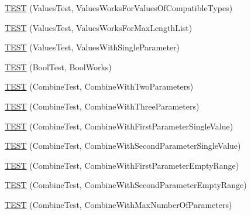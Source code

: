 \begin{DoxyCompactItemize}
\item 
\mbox{\hyperlink{_obj__test_2lib_2googletest-master_2googletest_2test_2googletest-param-test-test_8cc_a079a199d832d0c61689193e9c9a4fd1a}{T\+E\+ST}} (Values\+Test, Values\+Works\+For\+Values\+Of\+Compatible\+Types)
\item 
\mbox{\hyperlink{_obj__test_2lib_2googletest-master_2googletest_2test_2googletest-param-test-test_8cc_a5d96d28bb6fd22c56222a4b358a8c65e}{T\+E\+ST}} (Values\+Test, Values\+Works\+For\+Max\+Length\+List)
\item 
\mbox{\hyperlink{_obj__test_2lib_2googletest-master_2googletest_2test_2googletest-param-test-test_8cc_af5c833610dcfcdfed7bcaa5f2e7dcf16}{T\+E\+ST}} (Values\+Test, Values\+With\+Single\+Parameter)
\item 
\mbox{\hyperlink{_obj__test_2lib_2googletest-master_2googletest_2test_2googletest-param-test-test_8cc_a3f3ae54fc86fcf5881329fb7e8e4b8ee}{T\+E\+ST}} (Bool\+Test, Bool\+Works)
\item 
\mbox{\hyperlink{_obj__test_2lib_2googletest-master_2googletest_2test_2googletest-param-test-test_8cc_a44831b3cbd99dd9df97741b57ce5f54c}{T\+E\+ST}} (Combine\+Test, Combine\+With\+Two\+Parameters)
\item 
\mbox{\hyperlink{_obj__test_2lib_2googletest-master_2googletest_2test_2googletest-param-test-test_8cc_abb0566c1dd1e93b040122f62019342b7}{T\+E\+ST}} (Combine\+Test, Combine\+With\+Three\+Parameters)
\item 
\mbox{\hyperlink{_obj__test_2lib_2googletest-master_2googletest_2test_2googletest-param-test-test_8cc_a93f6f860828c8e67a9bf8b8e254d8bde}{T\+E\+ST}} (Combine\+Test, Combine\+With\+First\+Parameter\+Single\+Value)
\item 
\mbox{\hyperlink{_obj__test_2lib_2googletest-master_2googletest_2test_2googletest-param-test-test_8cc_aa3972149c4cee8b2e4aa42890cf6faca}{T\+E\+ST}} (Combine\+Test, Combine\+With\+Second\+Parameter\+Single\+Value)
\item 
\mbox{\hyperlink{_obj__test_2lib_2googletest-master_2googletest_2test_2googletest-param-test-test_8cc_a05e6de39d2004ec6509fd02c41b1f941}{T\+E\+ST}} (Combine\+Test, Combine\+With\+First\+Parameter\+Empty\+Range)
\item 
\mbox{\hyperlink{_obj__test_2lib_2googletest-master_2googletest_2test_2googletest-param-test-test_8cc_aa40c83cd556e38939e00465e2a18d035}{T\+E\+ST}} (Combine\+Test, Combine\+With\+Second\+Parameter\+Empty\+Range)
\item 
\mbox{\hyperlink{_obj__test_2lib_2googletest-master_2googletest_2test_2googletest-param-test-test_8cc_a9e14f2d8d5c981a66a27e50a597adc3c}{T\+E\+ST}} (Combine\+Test, Combine\+With\+Max\+Number\+Of\+Parameters)

\end{DoxyCompactItemize}
